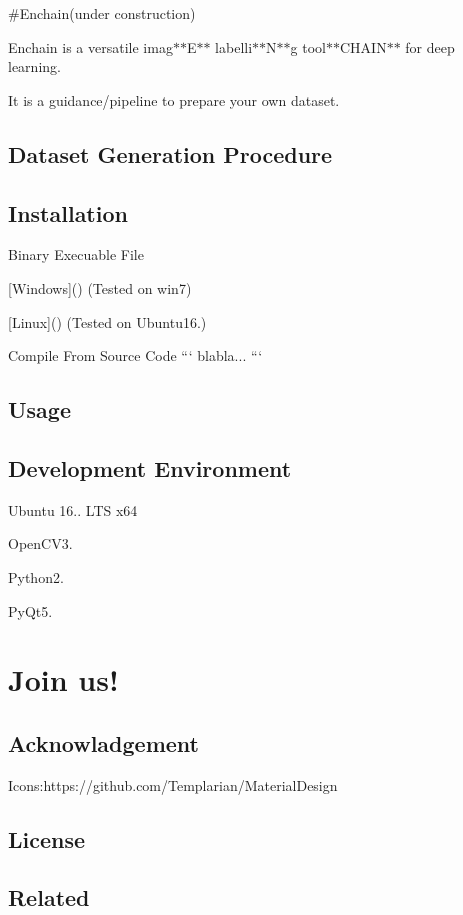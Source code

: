 \#\href{https://github.com/Zhehua-Hu/Enchain}{\tt }Enchain(under construction)

Enchain is a versatile imag$\ast$$\ast$\+E$\ast$$\ast$ labelli$\ast$$\ast$\+N$\ast$$\ast$g tool$\ast$$\ast$\+C\+H\+A\+I\+N$\ast$$\ast$ for deep learning.

It is a guidance/pipeline to prepare your own dataset.

\subsection*{Dataset Generation Procedure}

 \subsection*{Installation}


\begin{DoxyItemize}
\item Binary Execuable File
\begin{DoxyItemize}
\item \mbox{[}Windows\mbox{]}() (Tested on win7)
\item \mbox{[}Linux\mbox{]}() (Tested on Ubuntu16.)
\end{DoxyItemize}
\item Compile From Source Code ``` blabla... ``` \subsection*{Usage}
\end{DoxyItemize}

\subsection*{Development Environment}


\begin{DoxyItemize}
\item Ubuntu 16.. L\+TS x64
\item Open\+C\+V3.
\item Python2.
\item Py\+Qt5.
\end{DoxyItemize}

\section*{Join us!}

\subsection*{Acknowladgement}

Icons\+:https\+://github.com/\+Templarian/\+Material\+Design

\subsection*{License}

\subsection*{Related}
